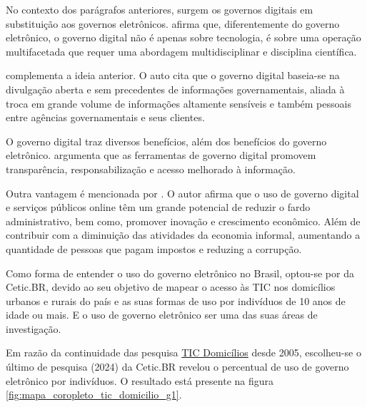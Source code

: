 No contexto dos parágrafos anteriores, surgem os governos digitais em substituição aos governos eletrônicos. \cite{veiga2016digital} afirma que, diferentemente do governo eletrônico, o governo digital não é apenas sobre tecnologia, é sobre uma operação multifacetada  que requer uma abordagem multidisciplinar e disciplina científica. 

\cite{bounabat2017government} complementa a ideia anterior. O auto cita que o governo digital baseia-se na divulgação aberta e sem precedentes de informações governamentais, aliada à troca em grande volume de informações altamente sensíveis e também pessoais entre agências governamentais e seus clientes. 

O governo digital traz diversos benefícios, além dos benefícios do governo eletrônico. \cite{martins2018war} argumenta que as ferramentas de governo digital promovem transparência, responsabilização e acesso melhorado à informação.

Outra vantagem é mencionada por \cite{veiga2016digital}. O autor afirma que o uso de governo digital e serviços públicos online têm um grande potencial de reduzir o fardo administrativo, bem como, promover inovação e crescimento econômico. Além de contribuir com a diminuição das atividades da economia informal, aumentando a quantidade de pessoas que pagam impostos e reduzing a corrupção.

Como forma de entender o uso do governo eletrônico no Brasil, optou-se por \cite{tic_domicilios_2024} da Cetic.BR, devido ao seu objetivo de mapear o acesso às TIC nos domicílios urbanos e rurais do país e as suas formas de uso por indivíduos de 10 anos de idade ou mais. E o uso de governo eletrônico ser uma das suas áreas de investigação.

Em razão da continuidade das pesquisa \href{https://cetic.br/pt/pesquisa/domicilios/}{TIC Domicílios} desde 2005, escolheu-se o último de pesquisa (2024) da Cetic.BR revelou o percentual de uso de governo eletrônico por indivíduos. O resultado está presente na figura \ref{fig:mapa_coropleto_tic_domicilio_g1}.

